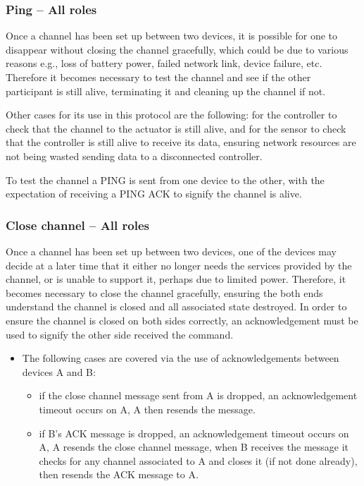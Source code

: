 \subsubsection{Ping -- All roles} %
\label{ssub:ping}
Once a channel has been set up between two devices, it is possible for one to disappear without closing the channel gracefully, which could be due to various reasons e.g., loss of battery power, failed network link, device failure, etc. Therefore it becomes necessary to test the channel and see if the other participant is still alive, terminating it and cleaning up the channel if not.

Other cases for its use in this protocol are the following: for the controller to check that the channel to the actuator is still alive, and for the sensor to check that the controller is still alive to receive its data, ensuring network resources are not being wasted sending data to a disconnected controller.

To test the channel a PING is sent from one device to the other, with the expectation of receiving a PING ACK to signify the channel is alive.

\subsubsection{Close channel -- All roles} %
\label{ssub:close_channel}
Once a channel has been set up between two devices, one of the devices may decide at a later time that it either no longer needs the services provided by the channel, or is unable to support it, perhaps due to limited power. Therefore, it becomes necessary to close the channel gracefully, ensuring the both ends understand the channel is closed and all associated state destroyed. In order to ensure the channel is closed on both sides correctly, an acknowledgement must be used to signify the other side received the command.
\vspace{-5mm} 
\begin{itemize}
	\item The following cases are covered via the use of acknowledgements between devices A and B:
	\begin{itemize}
		\item if the close channel message sent from A is dropped, an acknowledgement timeout occurs on A, A then resends the message.
		\item if B's ACK message is dropped, an acknowledgement timeout occurs on A, A resends the close channel message, when B receives the message it checks for any channel associated to A and closes it (if not done already), then resends the ACK message to A.
	\end{itemize}
\end{itemize}


